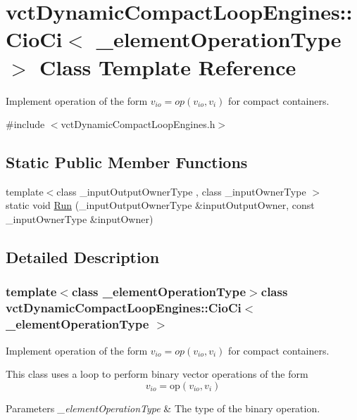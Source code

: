 \hypertarget{classvct_dynamic_compact_loop_engines_1_1_cio_ci}{}\section{vct\+Dynamic\+Compact\+Loop\+Engines\+:\+:Cio\+Ci$<$ \+\_\+element\+Operation\+Type $>$ Class Template Reference}
\label{classvct_dynamic_compact_loop_engines_1_1_cio_ci}


Implement operation of the form $v_{io} = op(v_{io}, v_i)$ for compact containers.  




{\ttfamily \#include $<$vct\+Dynamic\+Compact\+Loop\+Engines.\+h$>$}

\subsection*{Static Public Member Functions}
\begin{DoxyCompactItemize}
\item 
{\footnotesize template$<$class \+\_\+input\+Output\+Owner\+Type , class \+\_\+input\+Owner\+Type $>$ }\\static void \hyperlink{classvct_dynamic_compact_loop_engines_1_1_cio_ci_a65c0346a54f6732d72f9476a428f6d2c}{Run} (\+\_\+input\+Output\+Owner\+Type \&input\+Output\+Owner, const \+\_\+input\+Owner\+Type \&input\+Owner)
\end{DoxyCompactItemize}


\subsection{Detailed Description}
\subsubsection*{template$<$class \+\_\+element\+Operation\+Type$>$class vct\+Dynamic\+Compact\+Loop\+Engines\+::\+Cio\+Ci$<$ \+\_\+element\+Operation\+Type $>$}

Implement operation of the form $v_{io} = op(v_{io}, v_i)$ for compact containers. 

This class uses a loop to perform binary vector operations of the form \[ v_{io} = \mathrm{op}(v_{io}, v_{i}) \]


\begin{DoxyParams}{Parameters}
{\em \+\_\+element\+Operation\+Type} & The type of the binary operation. \\
\hline
\end{DoxyParams}


